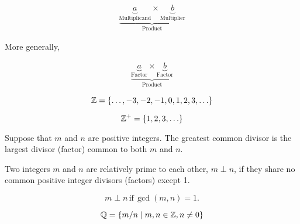 \documentclass[20150903-160354-rs2.2-MarksMathNotebook.tex]{subfiles}
\begin{document}
\begin{definition} 
\begin{align}
\underbrace{\underbrace{a}_{\text{Multiplicand}} \times \underbrace{b}_{\text{Multiplier}}}_{\text{Product}} \label{eq:oom}
\end{align}

More generally,

\begin{align}
\underbrace{\underbrace{a}_{\text{Factor}} \times \underbrace{b}_{\text{Factor}}}_{\text{Product}} \label{eq:oomg}
\end{align}

\end{definition}



\begin{definition}[Integers]

\[
\mathbb{Z}=\left\{\ldots, -3, -2, -1, 0, 1, 2, 3, \ldots\right\}
\]

\end{definition}

\begin{definition}

\[
\mathbb{Z}^{+}=\left\{1, 2, 3, \ldots\right\}
\]
\end{definition}


\begin{definition}

Suppose that $m$ and $n$ are positive integers.  The greatest common divisor is the largest divisor (factor) common to both $m$ and $n$.

\end{definition}

\begin{definition}

Two integers $m$ and $n$ are relatively prime to each other, $m \perp n$, if they share no common positive integer divisors (factors) except 1.

\[
m \perp n \, \text{if} \, \gcd(m, n)=1.
\]

\end{definition}

\begin{definition}

\[
\mathbb{Q}=\set{m/n \suchthat m,n \in \mathbb{Z}, n \ne 0}
\]
\end{definition}
\end{document}
